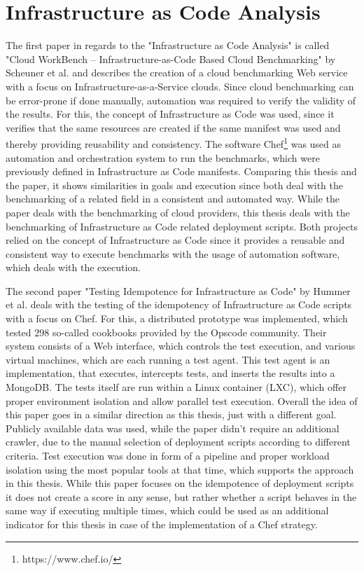 \section{Infrastructure as Code Analysis}
\label{sec:iaca}
The first paper in regards to the "Infrastructure as Code Analysis" is called "Cloud WorkBench – Infrastructure-as-Code Based Cloud Benchmarking" \cite{cloudworkbench} by Scheuner et al. and describes the creation of a cloud benchmarking Web service with a focus on Infrastructure-as-a-Service clouds. Since cloud benchmarking can be error-prone if done manually, automation was required to verify the validity of the results. For this, the concept of Infrastructure as Code was used, since it verifies that the same resources are created if the same manifest was used and thereby providing reusability and consistency. The software Chef\footnote{https://www.chef.io/} was used as automation and orchestration system to run the benchmarks, which were previously defined in Infrastructure as Code manifests. Comparing this thesis and the paper, it shows similarities in goals and execution since both deal with the benchmarking of a related field in a consistent and automated way. While the paper deals with the benchmarking of cloud providers, this thesis deals with the benchmarking of Infrastructure as Code related deployment scripts. Both projects relied on the concept of Infrastructure as Code since it provides a reusable and consistent way to execute benchmarks with the usage of automation software, which deals with the execution.

The second paper "Testing Idempotence for Infrastructure as Code" \cite{idempotence} by Hummer et al. deals with the testing of the idempotency of Infrastructure as Code scripts with a focus on Chef. For this, a distributed prototype was implemented, which tested 298 so-called cookbooks provided by the Opscode community. Their system consists of a Web interface, which controls the test execution, and various virtual machines, which are each running a test agent. This test agent is an implementation, that executes, intercepts tests, and inserts the results into a MongoDB. The tests itself are run within a Linux container (LXC), which offer proper environment isolation and allow parallel test execution. Overall the idea of this paper goes in a similar direction as this thesis, just with a different goal. Publicly available data was used, while the paper didn't require an additional crawler, due to the manual selection of deployment scripts according to different criteria. Test execution was done in form of a pipeline and proper workload isolation using the most popular tools at that time, which supports the approach in this thesis. While this paper focuses on the idempotence of deployment scripts it does not create a score in any sense, but rather whether a script behaves in the same way if executing multiple times, which could be used as an additional indicator for this thesis in case of the implementation of a Chef strategy.

